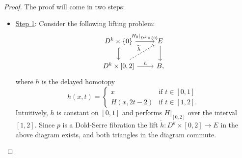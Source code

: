 \documentclass{article}
\newtheorem{proposed work}[theorem]{Proposed Work}
\theoremstyle{definition}
\begin{document}
\begin{proof}
The proof will come in two steps:

\begin{itemize}
\item \underline{Step 1}: Consider the following lifting problem:
\begin{equation*}
\begin{tikzcd}
D^k \times \{0\} \arrow[r, "H_0|_{D^k \times \{0\}}"] \arrow[d,hookrightarrow] & E \arrow[d] \\
D^k \times [0,2] \arrow[r,"h"] \arrow[ur,"\widetilde{h}", dashed] & B,
\end{tikzcd}
\end{equation*}
where $h$ is the delayed homotopy
\begin{equation*}
h(x,t) = \begin{cases} x & \text{if } t \in [0,1] \\ H(x,2t-2) & \text{if } t \in [1,2]. \end{cases}
\end{equation*}
Intuitively, $h$ is constant on $[0,1]$ and performs $H|_{[0,2]}$ over the interval $[1,2]$. Since $p$ is a Dold-Serre fibration the lift $\widetilde{h}: D^k \times [0,2] \to E$ in the above diagram exists, and both triangles in the diagram commute.


\end{itemize}
\end{proof}
\end{document}
